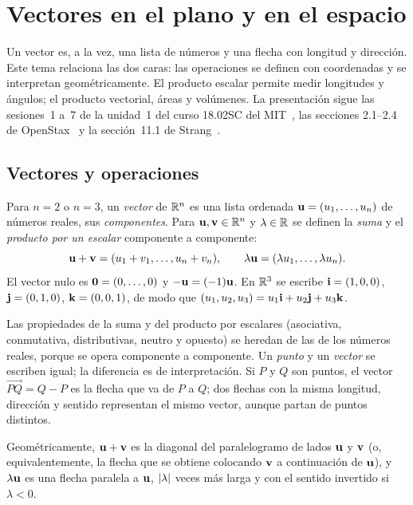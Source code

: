\chapter{Vectores en el plano y en el espacio}
\label{tema:1}

Un vector es, a la vez, una lista de números y una flecha con longitud y dirección. Este tema relaciona las dos caras: las operaciones se definen con coordenadas y se interpretan geométricamente. El producto escalar permite medir longitudes y ángulos; el producto vectorial, áreas y volúmenes. La presentación sigue las sesiones~1 a~7 de la unidad~1 del curso 18.02SC del MIT~\cite{mit1802}, las secciones 2.1--2.4 de OpenStax~\cite{openstax3} y la sección~11.1 de Strang~\cite{strangcalc}.

\section{Vectores y operaciones}

\begin{definicion}[Vectores de $\R^n$]\label{def:vector}
Para $n=2$ o $n=3$, un \emph{vector} de $\R^n$ es una lista ordenada $\mathbf{u}=(u_1,\dots,u_n)$ de números reales, sus \emph{componentes}. Para $\mathbf{u},\mathbf{v}\in\mathbb{R}^n$ y $\lambda\in\mathbb{R}$ se definen la \emph{suma} y el \emph{producto por un escalar} componente a componente:
\[
\mathbf{u}+\mathbf{v}=(u_1+v_1,\dots,u_n+v_n),\qquad \lambda\mathbf{u}=(\lambda u_1,\dots,\lambda u_n).
\]
El vector nulo es $\mathbf{0}=(0,\dots,0)$ y $-\mathbf{u}=(-1)\mathbf{u}$. En $\mathbb{R}^3$ se escribe $\mathbf{i}=(1,0,0)$, $\mathbf{j}=(0,1,0)$, $\mathbf{k}=(0,0,1)$, de modo que $(u_1,u_2,u_3)=u_1\mathbf{i}+u_2\mathbf{j}+u_3\mathbf{k}$.
\end{definicion}

Las propiedades de la suma y del producto por escalares (asociativa, conmutativa, distributivas, neutro y opuesto) se heredan de las de los números reales, porque se opera componente a componente. Un \emph{punto} y un \emph{vector} se escriben igual; la diferencia es de interpretación. Si $P$ y $Q$ son puntos, el vector $\overrightarrow{PQ}=Q-P$ es la flecha que va de $P$ a $Q$; dos flechas con la misma longitud, dirección y sentido representan el mismo vector, aunque partan de puntos distintos.

Geométricamente, $\mathbf{u}+\mathbf{v}$ es la diagonal del paralelogramo de lados $\mathbf{u}$ y $\mathbf{v}$ (o, equivalentemente, la flecha que se obtiene colocando $\mathbf{v}$ a continuación de $\mathbf{u}$), y $\lambda\mathbf{u}$ es una flecha paralela a $\mathbf{u}$, $\lvert\lambda\rvert$ veces más larga y con el sentido invertido si $\lambda<0$.


